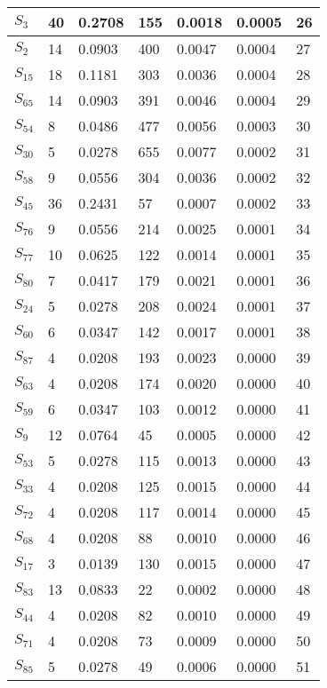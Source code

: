 \begin{xltabular}{\textwidth}{|X|X|X|X|X|X|X|}
 $S_{3}$ & 40 & 0.2708 & 155 & 0.0018 & 0.0005 & 26 \\ \hline
 $S_{2}$ & 14 & 0.0903 & 400 & 0.0047 & 0.0004 & 27 \\ \hline
 $S_{15}$ & 18 & 0.1181 & 303 & 0.0036 & 0.0004 & 28 \\ \hline
 $S_{65}$ & 14 & 0.0903 & 391 & 0.0046 & 0.0004 & 29 \\ \hline
 $S_{54}$ & 8 & 0.0486 & 477 & 0.0056 & 0.0003 & 30 \\ \hline
 $S_{30}$ & 5 & 0.0278 & 655 & 0.0077 & 0.0002 & 31 \\ \hline
 $S_{58}$ & 9 & 0.0556 & 304 & 0.0036 & 0.0002 & 32 \\ \hline
 $S_{45}$ & 36 & 0.2431 & 57 & 0.0007 & 0.0002 & 33 \\ \hline
 $S_{76}$ & 9 & 0.0556 & 214 & 0.0025 & 0.0001 & 34 \\ \hline
 $S_{77}$ & 10 & 0.0625 & 122 & 0.0014 & 0.0001 & 35 \\ \hline
 $S_{80}$ & 7 & 0.0417 & 179 & 0.0021 & 0.0001 & 36 \\ \hline
 $S_{24}$ & 5 & 0.0278 & 208 & 0.0024 & 0.0001 & 37 \\ \hline
 $S_{60}$ & 6 & 0.0347 & 142 & 0.0017 & 0.0001 & 38 \\ \hline
 $S_{87}$ & 4 & 0.0208 & 193 & 0.0023 & 0.0000 & 39 \\ \hline
 $S_{63}$ & 4 & 0.0208 & 174 & 0.0020 & 0.0000 & 40 \\ \hline
 $S_{59}$ & 6 & 0.0347 & 103 & 0.0012 & 0.0000 & 41 \\ \hline
 $S_{9}$ & 12 & 0.0764 & 45 & 0.0005 & 0.0000 & 42 \\ \hline
 $S_{53}$ & 5 & 0.0278 & 115 & 0.0013 & 0.0000 & 43 \\ \hline
 $S_{33}$ & 4 & 0.0208 & 125 & 0.0015 & 0.0000 & 44 \\ \hline
 $S_{72}$ & 4 & 0.0208 & 117 & 0.0014 & 0.0000 & 45 \\ \hline
 $S_{68}$ & 4 & 0.0208 & 88 & 0.0010 & 0.0000 & 46 \\ \hline
 $S_{17}$ & 3 & 0.0139 & 130 & 0.0015 & 0.0000 & 47 \\ \hline
 $S_{83}$ & 13 & 0.0833 & 22 & 0.0002 & 0.0000 & 48 \\ \hline
 $S_{44}$ & 4 & 0.0208 & 82 & 0.0010 & 0.0000 & 49 \\ \hline
 $S_{71}$ & 4 & 0.0208 & 73 & 0.0009 & 0.0000 & 50 \\ \hline
 $S_{85}$ & 5 & 0.0278 & 49 & 0.0006 & 0.0000 & 51 \\ \hline

\end{xltabular}
